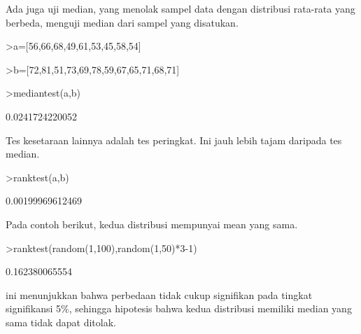 \documentclass[a4paper,10pt]{article}
\begin{document}
\begin{eulernotebook}
\begin{eulercomment}
\begin{eulercomment}
\begin{eulercomment}
\begin{eulercomment}
\begin{eulercomment}
Ada juga uji median, yang menolak sampel data dengan distribusi
rata-rata yang berbeda, menguji median dari sampel yang disatukan.
\end{eulercomment}
\begin{eulerprompt}
>a=[56,66,68,49,61,53,45,58,54]
\end{eulerprompt}
\begin{euleroutput}
  [56,  66,  68,  49,  61,  53,  45,  58,  54]
\end{euleroutput}
\begin{eulerprompt}
>b=[72,81,51,73,69,78,59,67,65,71,68,71]
\end{eulerprompt}
\begin{euleroutput}
  [72,  81,  51,  73,  69,  78,  59,  67,  65,  71,  68,  71]
\end{euleroutput}
\begin{eulerprompt}
>mediantest(a,b)
\end{eulerprompt}
\begin{euleroutput}
  0.0241724220052
\end{euleroutput}
\begin{eulercomment}
Tes kesetaraan lainnya adalah tes peringkat. Ini jauh lebih tajam
daripada tes median.
\end{eulercomment}
\begin{eulerprompt}
>ranktest(a,b)
\end{eulerprompt}
\begin{euleroutput}
  0.00199969612469
\end{euleroutput}
\begin{eulercomment}
Pada contoh berikut, kedua distribusi mempunyai mean yang sama.
\end{eulercomment}
\begin{eulerprompt}
>ranktest(random(1,100),random(1,50)*3-1)
\end{eulerprompt}
\begin{euleroutput}
  0.162380065554
\end{euleroutput}
\begin{eulercomment}
ini menunjukkan bahwa perbedaan tidak cukup signifikan pada tingkat
signifikansi 5\%, sehingga hipotesis bahwa kedua distribusi memiliki
median yang sama tidak dapat ditolak.


\end{eulercomment}
\end{eulercomment}
\end{eulercomment}
\end{eulercomment}
\end{eulercomment}
\end{eulernotebook}
\end{document}
